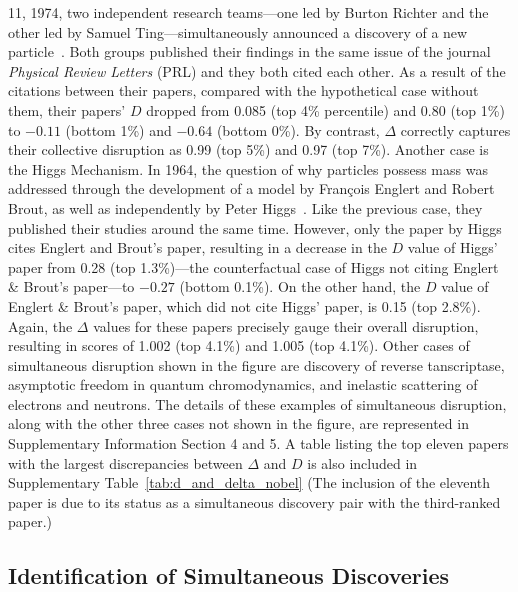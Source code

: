 \documentclass[12pt]{article}
\begin{document}
11, 1974, two independent research teams---one led by Burton Richter and the other led by Samuel Ting---simultaneously announced a discovery of a new particle~\cite{aubert1974experimental,augustin1974discovery}. Both groups published their findings in the same issue of the journal \emph{Physical Review Letters} (PRL) and they both cited each other. As a result of the citations between their papers, compared with the hypothetical case without them, their papers' $D$ dropped from 0.085 (top 4\% percentile) and 0.80 (top 1\%) to $-0.11$ (bottom 1\%) and $-0.64$ (bottom 0\%). By contrast, $\Delta$ correctly captures their collective disruption as 0.99 (top 5\%) and 0.97 (top 7\%). Another case is the Higgs Mechanism. In 1964, the question of why particles possess mass was addressed through the development of a model by François Englert and Robert Brout, as well as independently by Peter Higgs~\cite{englert1964broken,higgs1964broken}. Like the previous case, they published their studies around the same time. However, only the paper by Higgs cites Englert and Brout's paper, resulting in a decrease in the $D$ value of Higgs' paper from 0.28 (top 1.3\%)---the counterfactual case of Higgs not citing Englert \& Brout's paper---to $-0.27$ (bottom 0.1\%). On the other hand, the $D$ value of Englert \& Brout's paper, which did not cite Higgs' paper, is 0.15 (top 2.8\%). Again, the $\Delta$ values for these papers precisely gauge their overall disruption, resulting in scores of 1.002 (top 4.1\%) and 1.005 (top 4.1\%). Other cases of simultaneous disruption shown in the figure are discovery of reverse tanscriptase, asymptotic freedom in quantum chromodynamics, and inelastic scattering of electrons and neutrons. The details of these examples of simultaneous disruption, along with the other three cases not shown in the figure, are represented in Supplementary Information Section 4 and 5. A table listing the top eleven papers with the largest discrepancies between $\Delta$ and $D$ is also included in Supplementary Table~\ref{tab:d_and_delta_nobel} (The inclusion of the eleventh paper is due to its status as a simultaneous discovery pair with the third-ranked paper.)






\subsection{Identification of Simultaneous Discoveries}
\end{document}
